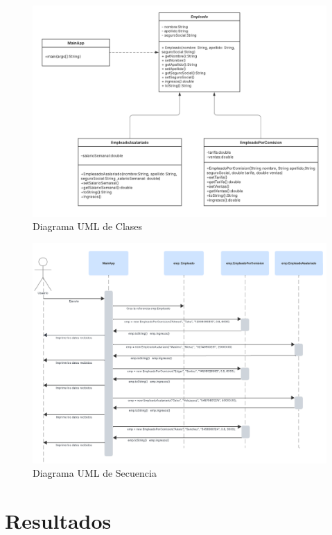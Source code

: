 \documentclass[letterpaper,12pt]{article}
\begin{document}
\begin{figure}[H]
    \centering
    \includegraphics[width=\linewidth]{Imagenes/Clase UML.png}
    \caption*{Diagrama UML de Clases}
\end{figure}
\begin{figure}[H]
    \centering
    \includegraphics[width=\linewidth]{Imagenes/Diagrama de secuencia.png}
    \caption*{Diagrama UML de Secuencia}
\end{figure}

\section{Resultados}
\end{document}
